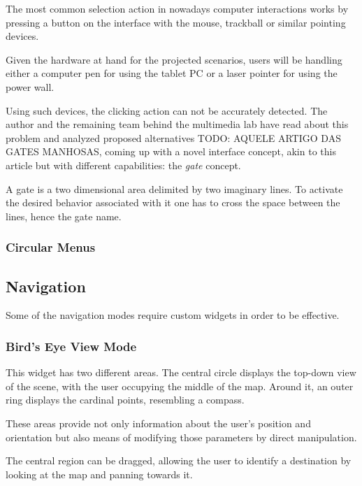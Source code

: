 The most common selection action in nowadays computer interactions works by
pressing a button on the interface with the mouse, trackball or similar pointing devices.

Given the hardware at hand for the projected scenarios,
users will be handling either a computer pen for using the tablet PC or a laser pointer for using the power wall.

Using such devices, the clicking action can not be accurately detected.
The author and the remaining team behind the multimedia lab have read about this problem and analyzed proposed alternatives {TODO: AQUELE ARTIGO DAS GATES MANHOSAS},
coming up with a novel interface concept, akin to this article but with different capabilities: the \emph{gate} concept.

A gate is a two dimensional area delimited by two imaginary lines. To activate the desired behavior associated
with it one has to cross the space between the lines, hence the gate name.


\subsubsection{Circular Menus}


\subsection{Navigation}

Some of the navigation modes require custom widgets in order to be effective.

\subsubsection{Bird's Eye View Mode}
\label{sec:bev}

This widget has two different areas.
The central circle displays the top-down view of the scene, with the user occupying the middle of the map.
Around it, an outer ring displays the cardinal points, resembling a compass.

These areas provide not only information about the user's position and orientation but also means of
modifying those parameters by direct manipulation.


The central region can be dragged, allowing the user to identify a destination by looking at the map and
panning towards it.

